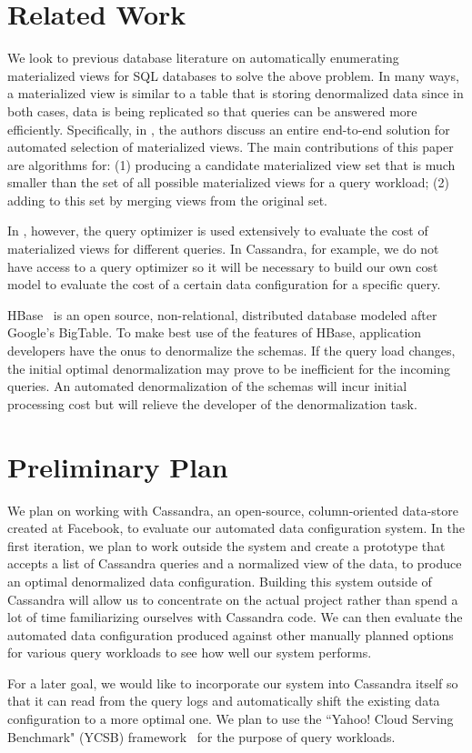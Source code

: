 \documentclass[12pt]{article}
\begin{document}
\section{Related Work}
We look to previous database literature on automatically enumerating materialized views for SQL databases to solve the above problem. 
In many ways, a materialized view is similar to a table that is storing denormalized data since in both cases, data is being replicated so 
that queries can be answered more efficiently. Specifically, in \cite{agrawal2000automated}, the authors discuss an entire end-to-end solution
for automated selection of materialized views. The main contributions of this paper are algorithms for: (1) producing a candidate materialized
view set that is much smaller than the set of all possible materialized views for a query workload; (2) adding to this set by merging views from 
the original set.

In \cite{agrawal2000automated}, however, the query optimizer is used extensively to evaluate the cost of materialized views for different queries.
In Cassandra, for example, we do not have access to a query optimizer so it will be necessary to build our own cost model to evaluate the cost
of a certain data configuration for a specific query. 

HBase~\cite{hbaseBook} is an open source, non-relational, distributed database modeled after Google's BigTable. To make best use of the features
of HBase, application developers have the onus to denormalize the schemas. If the query load changes, the initial optimal denormalization may
prove to be inefficient for the incoming queries. An automated denormalization of the schemas will incur initial processing cost but will relieve
the developer of the denormalization task.

\section{Preliminary Plan}
We plan on working with Cassandra, an open-source, column-oriented data-store created at Facebook, to evaluate our automated data configuration
system. In the first iteration, we plan to work outside the system and create a prototype that accepts a list of Cassandra queries and a normalized
view of the data, to produce an optimal denormalized data configuration. Building this system outside of Cassandra will allow us to concentrate on 
the actual project rather than spend a lot of time familiarizing ourselves with Cassandra code. We can then evaluate the automated data configuration 
produced against other manually planned options for various query workloads to see how well our system performs.

For a later goal, we would like to incorporate our system into Cassandra itself so that it can read from the query logs and automatically shift 
the existing data configuration to a more optimal one. We plan to use the ``Yahoo! Cloud Serving Benchmark" (YCSB) framework~\cite{ycsb} for the
purpose of query workloads.



\end{document}
